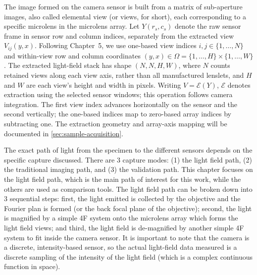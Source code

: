 The image formed on the camera sensor is built from a matrix of sub-aperture images, also called elemental view (or views, for short), each corresponding to a specific microlens in the microlens array.
Let $Y(r_s,c_s)$ denote the raw sensor frame in sensor row and column indices, separately from the extracted view $V_{ij}(y,x)$.
Following Chapter~5, we use one-based view indices $i,j\in\{1,\ldots,N\}$ and within-view row and column coordinates $(y,x)\in\Omega=\{1,\ldots,H\}\times\{1,\ldots,W\}$.
The extracted light-field stack has shape $(N,N,H,W)$, where $N$ counts retained views along each view axis, rather than all manufactured lenslets, and $H$ and $W$ are each view's height and width in pixels.
Writing $V=\mathcal E(Y)$, $\mathcal E$ denotes extraction using the selected sensor windows; this operation follows camera integration.
The first view index advances horizontally on the sensor and the second vertically; the one-based indices map to zero-based array indices by subtracting one.
The extraction geometry and array-axis mapping will be documented in \cref{sec:sample-acquisition}.

The exact path of light from the specimen to the different sensors depends on the specific capture discussed.
There are 3 capture modes: (1) the light field path, (2) the traditional imaging path, and (3) the validation path.
This chapter focuses on the light field path, which is the main path of interest for this work, while the others are used as comparison tools.
The light field path can be broken down into 3 sequential steps: first, the light emitted is collected by the objective and the Fourier plan is formed (or the back focal plane of the objective); second, the light is magnified by a simple 4F system onto the microlens array which forms the light field views; and third, the light field is de-magnified by another simple 4F system to fit inside the camera sensor.
It is important to note that the camera is a discrete, intensity-based sensor, so the actual light-field data measured is a discrete sampling of the intensity of the light field (which is a complex continuous function in space).

